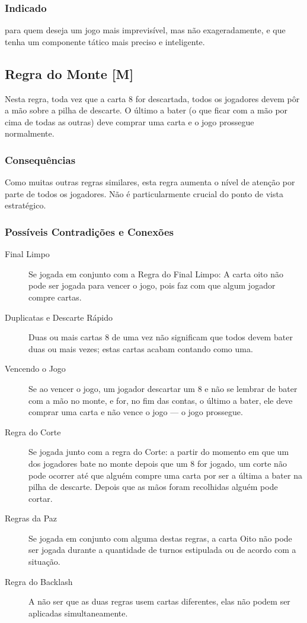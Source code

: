 \subsubsection{Indicado} 

para quem deseja um jogo mais imprevisível, mas não exageradamente, e que tenha um componente tático mais preciso e inteligente.

\subsection{Regra do Monte [M]}

Nesta regra, toda vez que a carta 8 for descartada, todos os jogadores devem pôr a mão sobre a pilha de descarte. O último a bater (o que ficar com a mão por cima de todas as outras) deve comprar uma carta e o jogo prossegue normalmente.

\subsubsection{Consequências}

Como muitas outras regras similares, esta regra aumenta o nível de atenção por parte de todos os jogadores. Não é particularmente crucial do ponto de vista estratégico.

\subsubsection{Possíveis Contradições e Conexões}

\begin{description}
\item[Final Limpo]{Se jogada em conjunto com a Regra do Final Limpo: A carta oito não pode ser jogada para vencer o jogo, pois faz com que algum jogador compre cartas.}
\item[Duplicatas e Descarte Rápido]{Duas ou mais cartas 8 de uma vez não significam que todos devem bater duas ou mais vezes; estas cartas acabam contando como uma.}
\item[Vencendo o Jogo]{Se ao vencer o jogo, um jogador descartar um 8 e não se lembrar de bater com a mão no monte, e for, no fim das contas, o último a bater, ele deve comprar uma carta e não vence o jogo --- o jogo prossegue.}
\item[Regra do Corte]{Se jogada junto com a regra do Corte: a partir do momento em que um dos jogadores bate no monte depois que um 8 for jogado, um corte não pode ocorrer até que alguém compre uma carta por ser a última a bater na pilha de descarte. Depois que as mãos foram recolhidas alguém pode cortar.}
\item[Regras da Paz]{Se jogada em conjunto com alguma destas regras, a carta Oito não pode ser jogada durante a quantidade de turnos estipulada ou de acordo com a situação.}
\item[Regra do Backlash]{A não ser que as duas regras usem cartas diferentes, elas não podem ser aplicadas simultaneamente.}
\end{description}

